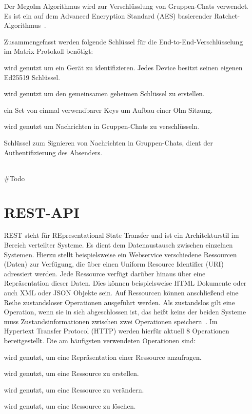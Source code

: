     Der Megolm Algorithmus wird zur Verschlüsslung von Gruppen-Chats verwendet.
    Es ist ein auf dem Advanced Encryption Standard (AES) basierender Ratchet-Algorithmus~\cite{megolm}.

    Zusammengefasst werden folgende Schlüssel für die End-to-End-Verschlüsselung im Matrix Protokoll benötigt:
    \begin{description}[leftmargin=!,labelwidth=3cm]
        \item [Ed25519 fingerprint key pair] wird genutzt um ein Gerät zu identifizieren. Jedes Device besitzt seinen eigenen Ed25519 Schlüssel.
        \item [Curve25519 identity key pair] wird genutzt um den gemeinsamen geheimen Schlüssel zu erstellen.
        \item [Curve25519 one-time keys] ein Set von einmal verwendbarer Keys um Aufbau einer Olm Sitzung.
        \item [Megolm encryption keys] wird genutzt um Nachrichten in Gruppen-Chats zu verschlüsseln.
        \item [Ed25519 Megolm signing key pair] Schlüssel zum Signieren von Nachrichten in Gruppen-Chats, dient der Authentifizierung des Absenders.
    \end{description}
    ~\cite{matrix-end-to-end-encryption}\\

    \#Todo



    \section{REST-API}\label{sec:rest}
    REST steht für REpresentational State Transfer und ist ein Architekturstil im Bereich verteilter Systeme.
    Es dient dem Datenaustausch zwischen einzelnen Systemen.
    Hierzu stellt beispielsweise ein Webservice verschiedene Ressourcen (Daten) zur Verfügung, die über einen Uniform Resource Identifier (URI) adressiert werden.
    Jede Ressource verfügt darüber hinaus über eine Repräsentation dieser Daten.
    Dies können beispielsweise HTML Dokumente oder auch XML oder JSON Objekte sein.
    Auf Ressourcen können anschließend eine Reihe zustandsloser Operationen ausgeführt werden.
    Als zustandslos gilt eine Operation, wenn sie in sich abgeschlossen ist, das heißt keins der beiden Systeme muss Zustandsinformationen zwischen zwei Operationen speichern~\cite{Dazer2012RESTfulA}.
    Im Hypertext Transfer Protocol (HTTP) werden hierfür aktuell 8 Operationen bereitgestellt.
    Die am häufigsten verwendeten Operationen sind:
    \begin{description}[leftmargin=!,labelwidth=2cm]
        \item [GET] wird genutzt, um eine Repräsentation einer Ressource anzufragen.
        \item [POST] wird genutzt, um eine Ressource zu erstellen.
        \item [PUT] wird genutzt, um eine Ressource zu verändern.
        \item [DELETE] wird genutzt, um eine Ressource zu löschen.
    \end{description}



